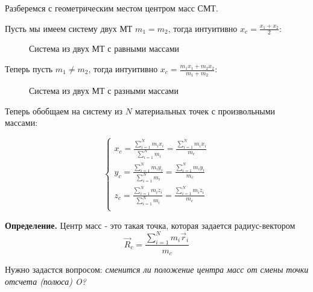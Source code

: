 \documentclass[a4paper,12pt]{extarticle}
\begin{document}
Разберемся с геометрическим местом центром масс СМТ. 

Пусть мы имеем систему двух МТ $m_1=m_2$, тогда интуитивно $x_c=\frac{x_1+x_2}{2}$:

\begin{figure}[htbp]
	\centering
	\caption{Система из двух МТ с равными массами}
\end{figure}

Теперь пусть $m_1\ne m_2$, тогда интуитивно $x_c=\frac{m_1x_1+m_2x_2}{m_1+m_2}$:

\begin{figure}[htbp]
	\centering
	\caption{Система из двух МТ с разными массами}
\end{figure}

Теперь обобщаем на систему из $N$ материальных точек с произвольными массами:

\begin{equation}
	\left\{\begin{aligned}
		x_c=\frac{\sum_{i=1}^{N} m_ix_i}{\sum_{i=1}^{N} m_i}=\frac{\sum_{i=1}^{N} m_ix_i}{m_c}\\
		y_c=\frac{\sum_{i=1}^{N} m_iy_i}{\sum_{i=1}^{N} m_i}=\frac{\sum_{i=1}^{N} m_iy_i}{m_c}\\
		z_c=\frac{\sum_{i=1}^{N} m_iz_i}{\sum_{i=1}^{N} m_i}=\frac{\sum_{i=1}^{N} m_iz_i}{m_c}\\
	\end{aligned}\right.
\end{equation}

\textbf{Определение.} Центр масс - это такая точка, которая задается радиус-вектором
\begin{equation}
	\vec{R}_c=\frac{\sum_{i=1}^N m_i\vec{r}_i}{m_c}
\end{equation}

Нужно задастся вопросом: \textit{сменится ли положение центра масс от смены точки отсчета (полюса) O?}
\end{document}
